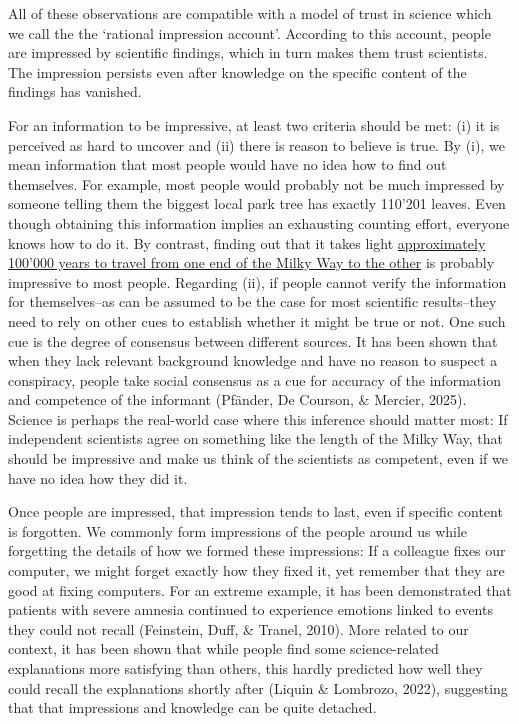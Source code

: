 \documentclass[
  doc,floatsintext]{apa6}
\begin{document}
All of these observations are compatible with a model of trust in science which we call the the `rational impression account'. According to this account, people are impressed by scientific findings, which in turn makes them trust scientists. The impression persists even after knowledge on the specific content of the findings has vanished.

For an information to be impressive, at least two criteria should be met: (i) it is perceived as hard to uncover and (ii) there is reason to believe is true. By (i), we mean information that most people would have no idea how to find out themselves. For example, most people would probably not be much impressed by someone telling them the biggest local park tree has exactly 110'201 leaves. Even though obtaining this information implies an exhausting counting effort, everyone knows how to do it. By contrast, finding out that it takes light \href{https://imagine.gsfc.nasa.gov/features/cosmic/milkyway_info.html}{approximately 100'000 years to travel from one end of the Milky Way to the other} is probably impressive to most people. Regarding (ii), if people cannot verify the information for themselves--as can be assumed to be the case for most scientific results--they need to rely on other cues to establish whether it might be true or not. One such cue is the degree of consensus between different sources. It has been shown that when they lack relevant background knowledge and have no reason to suspect a conspiracy, people take social consensus as a cue for accuracy of the information and competence of the informant (Pfänder, De Courson, \& Mercier, 2025). Science is perhaps the real-world case where this inference should matter most: If independent scientists agree on something like the length of the Milky Way, that should be impressive and make us think of the scientists as competent, even if we have no idea how they did it.

Once people are impressed, that impression tends to last, even if specific content is forgotten. We commonly form impressions of the people around us while forgetting the details of how we formed these impressions: If a colleague fixes our computer, we might forget exactly how they fixed it, yet remember that they are good at fixing computers. For an extreme example, it has been demonstrated that patients with severe amnesia continued to experience emotions linked to events they could not recall (Feinstein, Duff, \& Tranel, 2010). More related to our context, it has been shown that while people find some science-related explanations more satisfying than others, this hardly predicted how well they could recall the explanations shortly after (Liquin \& Lombrozo, 2022), suggesting that that impressions and knowledge can be quite detached.
\end{document}
